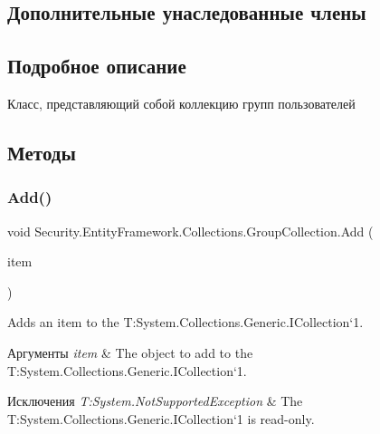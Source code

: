 \subsection*{Дополнительные унаследованные члены}


\subsection{Подробное описание}
Класс, представляющий собой коллекцию групп пользователей 



\subsection{Методы}
\mbox{\label{class_security_1_1_entity_framework_1_1_collections_1_1_group_collection_ac7e4a9e6cbb17ae2bd0c30056dad2b6e}} 
\subsubsection{\texorpdfstring{Add()}{Add()}}
{\footnotesize\ttfamily void Security.\+Entity\+Framework.\+Collections.\+Group\+Collection.\+Add (\begin{DoxyParamCaption}\item[{\hyperlink{interface_security_1_1_interfaces_1_1_model_1_1_i_group}{I\+Group}}]{item }\end{DoxyParamCaption})}



Adds an item to the T\+:\+System.\+Collections.\+Generic.\+I\+Collection`1. 


\begin{DoxyParams}{Аргументы}
{\em item} & The object to add to the T\+:\+System.\+Collections.\+Generic.\+I\+Collection`1.\\
\hline
\end{DoxyParams}

\begin{DoxyExceptions}{Исключения}
{\em T\+:\+System.\+Not\+Supported\+Exception} & The T\+:\+System.\+Collections.\+Generic.\+I\+Collection`1 is read-\/only.\\
\hline
\end{DoxyExceptions}
\mbox{\label{class_security_1_1_entity_framework_1_1_collections_1_1_group_collection_a53a32fbd4d12e25cffce364f6ac87bf5}} 
